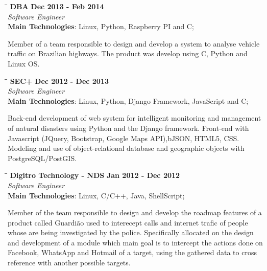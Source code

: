 \documentclass[margin]{res}
\begin{document}
\begin{resume}
\vspace{-0.1in}
   \begin{tabbing}
   \hspace{2.3in}\= \hspace{1.7in}\= \kill %
    \textbf{DBA}    \>\>\textbf{Dec 2013 - Feb 2014}\\
    \textit{Software Engineer}\\        
    \textbf{Main Technologies}: Linux, Python, Raspberry PI and C;
   \end{tabbing}\vspace{-20pt}      %
    \vspace{2mm}
        Member of a team responsible to design and develop a system to analyse vehicle traffic on Brazilian highways. The product was develop using C, Python and Linux OS.

\vspace{-0.1in}
   \begin{tabbing}
   \hspace{2.3in}\= \hspace{1.7in}\= \kill %
    \textbf{SEC+}    \>\>\textbf{Dec 2012 - Dec 2013}\\
    \textit{Software Engineer}\\        
    \textbf{Main Technologies}: Linux, Python, Django Framework, JavaScript and C;
   \end{tabbing}\vspace{-20pt}      %
    \vspace{2mm}
     Back-end development of web system for intelligent monitoring and management of natural disasters using Python and the Django framework. Front-end with Javascript (JQuery, Bootstrap, Google Maps API),bJSON, HTML5, CSS. Modeling and use of object-relational database and geographic objects with
     PostgreSQL/PostGIS.

\vspace{-0.1in}
   \begin{tabbing}
   \hspace{2.3in}\= \hspace{1.7in}\= \kill %
    \textbf{Digitro Technology - NDS}    \>\>\textbf{Jan 2012 - Dec 2012}\\
    \textit{Software Engineer}\\   
    \textbf{Main Technologies}: Linux, C/C++, Java, ShellScript;
   \end{tabbing}\vspace{-20pt}      %
    \vspace{2mm}
    Member of the team responsible to design and develop the roadmap features of a product called
    Guardião used to interecept calls and internet trafic of people whose are being investigated by the police. Specifically allocated on the design and development of a module which main goal is to intercept the actions done on Facebook, WhatsApp and Hotmail of a target, using the gathered data to cross reference with another possible targets.


\end{resume}
\end{document}
